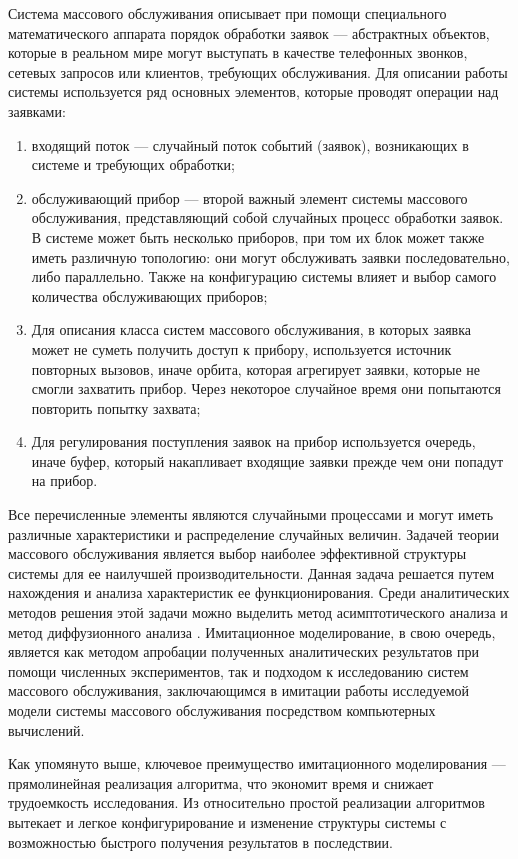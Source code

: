 Система массового обслуживания описывает при помощи специального математического аппарата \cite{nazarov2010theory} порядок обработки заявок --- абстрактных объектов, которые в реальном мире могут выступать в качестве телефонных звонков, сетевых запросов или клиентов, требующих обслуживания. Для описании работы системы используется ряд основных элементов, которые проводят операции над заявками:
\begin{enumerate}
	\item входящий поток --- случайный поток событий (заявок), возникающих в системе и требующих обработки;
	\item обслуживающий прибор --- второй важный элемент системы массового обслуживания, представляющий собой случайных процесс обработки заявок. В системе может быть несколько приборов, при том их блок может также иметь различную топологию: они могут обслуживать заявки последовательно, либо параллельно. Также на конфигурацию системы влияет и выбор самого количества обслуживающих приборов;
	\item Для описания класса систем массового обслуживания, в которых заявка может не суметь получить доступ к прибору, используется источник повторных вызовов, иначе орбита, которая агрегирует заявки, которые не смогли захватить прибор. Через некоторое случайное время они попытаются повторить попытку захвата;
	\item Для регулирования поступления заявок на прибор используется очередь, иначе буфер, который накапливает входящие заявки прежде чем они попадут на прибор.
\end{enumerate} 

Все перечисленные элементы являются случайными процессами и могут иметь различные характеристики и распределение случайных величин. Задачей теории массового обслуживания является выбор наиболее эффективной структуры системы для ее наилучшей производительности. Данная задача решается путем нахождения и анализа характеристик ее функционирования. Среди аналитических методов решения этой задачи можно выделить метод асимптотического анализа \cite{назаров1991асимптотический} и метод диффузионного анализа \cite{назаров2021исследование}. Имитационное моделирование, в свою очередь, является как методом апробации полученных аналитических результатов при помощи численных экспериментов, так и подходом к исследованию систем массового обслуживания, заключающимся в имитации работы исследуемой модели системы массового обслуживания посредством компьютерных вычислений. 

Как упомянуто выше, ключевое преимущество имитационного моделирования --- прямолинейная реализация алгоритма, что экономит время и снижает трудоемкость исследования. Из относительно простой реализации алгоритмов вытекает и легкое конфигурирование и изменение структуры системы с возможностью быстрого получения результатов в последствии.

